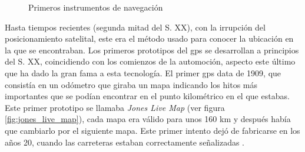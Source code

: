 \begin{figure}[h!btp]
	\begin{adjustbox}{minipage=\linewidth, fbox}
		\centering
		\hspace{10mm}
	\end{adjustbox}
	\caption{Primeros instrumentos de navegación}
	\label{fig:sextante_astrolabio}
\end{figure}

Hasta tiempos recientes (segunda mitad del S. XX), con la irrupción del posicionamiento satelital, este era el método usado para conocer la ubicación en la que se encontraban.
Los primeros prototipos del gps se desarrollan a principios del S. XX, coincidiendo con los comienzos de la automoción, aspecto este último que ha dado la gran fama a esta tecnología.
El primer gps data de 1909, que consistía en un odómetro que giraba un mapa indicando los hitos más importantes que se podían encontrar en el punto kilométrico en el que estabas.
Este primer prototipo se llamaba \textit{Jones Live Map} (ver figura \ref{fig:jones_live_map}), cada mapa era válido para unos 160 km y después había que cambiarlo por el siguiente mapa. Este primer intento dejó de fabricarse en los años 20, cuando las carreteras estaban correctamente señalizadas \cite{GPS12}.

